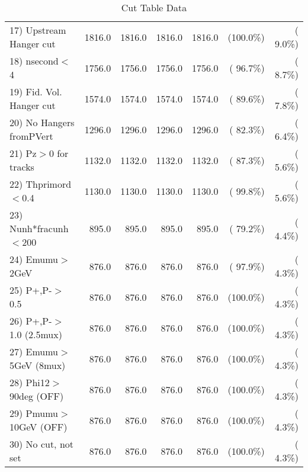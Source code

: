\begin{table}[h!]
\begin{tabular}{||l||r|r|r|r|r|r||}
 17) Upstream Hanger cut  &       1816.0 &       1816.0 &       1816.0 &       1816.0 & (100.0\%) & (  9.0\%) \\
 18) nsecond$<$4          &       1756.0 &       1756.0 &       1756.0 &       1756.0 & ( 96.7\%) & (  8.7\%) \\
 19) Fid. Vol. Hanger cut &       1574.0 &       1574.0 &       1574.0 &       1574.0 & ( 89.6\%) & (  7.8\%) \\
 20) No Hangers fromPVert &       1296.0 &       1296.0 &       1296.0 &       1296.0 & ( 82.3\%) & (  6.4\%) \\
 21) Pz$>$0 for tracks    &       1132.0 &       1132.0 &       1132.0 &       1132.0 & ( 87.3\%) & (  5.6\%) \\
 22) Thprimord$<$0.4      &       1130.0 &       1130.0 &       1130.0 &       1130.0 & ( 99.8\%) & (  5.6\%) \\
 23) Nunh*fracunh$<$200   &        895.0 &        895.0 &        895.0 &        895.0 & ( 79.2\%) & (  4.4\%) \\
 24) Emumu$>$2GeV         &        876.0 &        876.0 &        876.0 &        876.0 & ( 97.9\%) & (  4.3\%) \\
 25) P+,P-$>$0.5          &        876.0 &        876.0 &        876.0 &        876.0 & (100.0\%) & (  4.3\%) \\
 26) P+,P-$>$1.0 (2.5mux) &        876.0 &        876.0 &        876.0 &        876.0 & (100.0\%) & (  4.3\%) \\
 27) Emumu$>$5GeV  (8mux) &        876.0 &        876.0 &        876.0 &        876.0 & (100.0\%) & (  4.3\%) \\
 28) Phi12$>$90deg  (OFF) &        876.0 &        876.0 &        876.0 &        876.0 & (100.0\%) & (  4.3\%) \\
 29) Pmumu$>$10GeV  (OFF) &        876.0 &        876.0 &        876.0 &        876.0 & (100.0\%) & (  4.3\%) \\
 30) No cut, not set      &        876.0 &        876.0 &        876.0 &        876.0 & (100.0\%) & (  4.3\%) \\
 \hline
 \hline
 \end{tabular}
 \caption{Cut Table  Data     }
 \label{tab-cutcohjpsi-mumu_data}
 \end{table}
